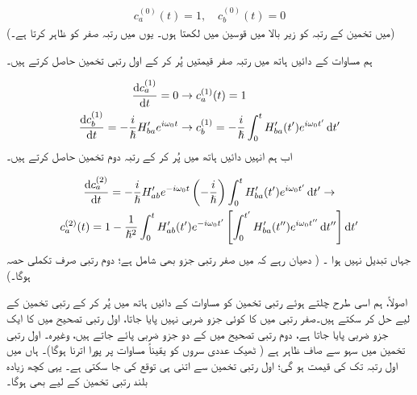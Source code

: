 \begin{align}
	c^{(0)}_a(t)=1,\quad c_b^{(0)}(t)=0
\end{align}
(میں تخمین کے رتبہ کو زیر بالا میں قوسین میں لکھتا ہوں۔ یوں  میں  رتبہ صفر کو ظاہر کرتا ہے۔)

ہم مساوات  کے دائیں ہاتھ میں رتبہ صفر قیمتیں پُر کر کے اول رتبی تخمین حاصل کرتے ہیں۔

\begin{gather}
\begin{aligned}\label{مساوات_تابع_مضطرب_اول_رتبی}
		\frac{\dif c_a^{(1)}}{\dif t}=0&\to c_a^{(1)}(t)=1 \\
		\frac{\dif c_b^{(1)}}{\dif t}=-\frac{i}{\hslash}H'_{ba}e^{i\omega_0t}&\to c_b^{(1)}=-\frac{i}{\hslash}\int_{0}^{t}H'_{ba}(t')e^{i\omega_0t'}\dif t'
\end{aligned}
\end{gather}
اب ہم انہیں دائیں ہاتھ میں پُر کر کے رتبہ دوم تخمین حاصل کرتے ہیں۔

\begin{multline}
		\frac{\dif c_a^{(2)}}{\dif t}=-\frac{i}{\hslash}H'_{ab}e^{-i\omega_0t}\left(-\frac{i}{\hslash}\right)\int_{0}^{t}H'_{ba}(t')e^{i\omega_0t'}\dif t'\to \\
		c_a^{(2)}(t)=1-\frac{1}{\hslash^2}\int_{0}^{t}H'_{ab}(t')e^{-i\omega_0t'}\left[\int_{0}^{t'}H'_{ba}(t'')e^{i\omega_0t''}\dif t''\right]\dif t'
\end{multline}
جہاں  تبدیل نہیں ہوا ۔ ( دھیان رہے کہ  میں صفر رتبی جزو بھی شامل ہے؛ دوم رتبی  صرف تکملی حصہ ہوگا۔)

اصولاً، ہم اسی طرح چلتے ہوئے  رتبی تخمین کو مساوات  کے دائیں ہاتھ میں پُر کر کے  رتبی تخمین کے لیے حل کر سکتے ہیں۔صفر رتبی میں  کا کوئی جزو ضربی نہیں پایا جاتا، اول رتبی تصحیح میں  کا ایک جزو ضربی پایا جاتا ہے، دوم رتبی تصحیح میں  کے دو جزو ضربی پائے جاتے ہیں، وغیرہ۔ اول رتبی تخمین میں سہو 
  سے صاف ظاہر ہے ( ٹھیک عددی سروں کو یقیناً مساوات  پر پورا اترنا ہوگا)۔ ہاں  میں اول رتبہ تک  کی قیمت  ہو گی؛ اول رتبی تخمین سے اتنی ہی توقع کی جا سکتی ہے۔ یہی کچھ زیادہ بلند رتبی تخمین کے لیے بھی ہوگا۔

